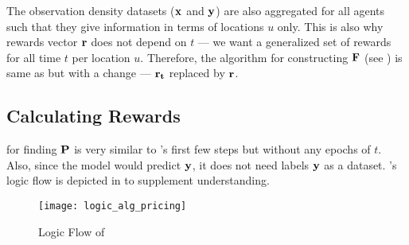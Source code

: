 The observation density datasets ($\mathbf{x}$ and $\mathbf{y}$) are also aggregated for all agents such that they give information in terms of locations $u$ only. This is also why rewards vector $\mathbf{r}$ does not depend on $t$ --- we want a generalized set of rewards for all time $t$ per location $u$. Therefore, the algorithm for constructing $\mathbf{F}$ (see ) is same as  but with a change --- $\mathbf{r_t}$ replaced by $\mathbf{r}$.

\subsection{Calculating Rewards} \label{sec:Calculating Rewards}
 for finding $\mathbf{P}$ is very similar to 's first few steps but without any epochs of $t$. Also, since the model would predict $\mathbf{y}$, it does not need labels $\mathbf{y}$ as a dataset. 's logic flow is depicted in  to supplement understanding.
\begin{figure}[!htbp]
    \centering
    \texttt{[image: logic\_alg\_pricing]}
    \caption{Logic Flow of }
    \label{fig:Logic Flow of Algorithm Pricing Problem}
\end{figure}
